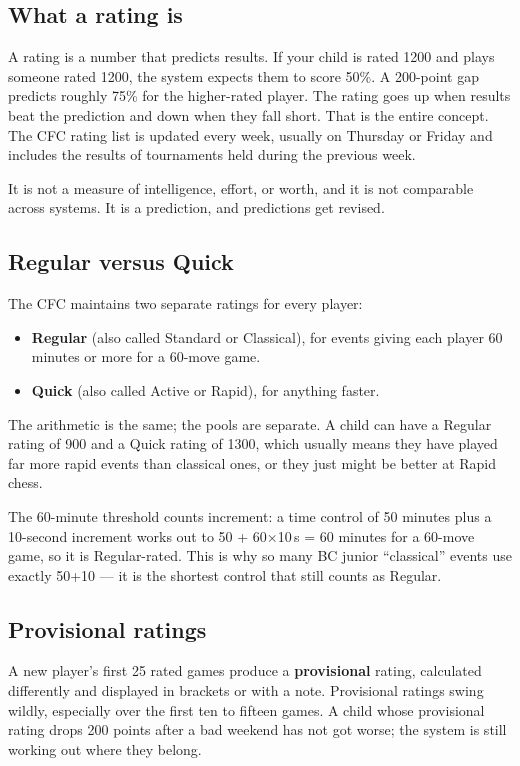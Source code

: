 \documentclass[10pt,letterpaper]{article}
\newcommand{\term}[1]{\textbf{#1}}
\begin{document}
\subsection{What a rating is}

A rating is a number that predicts results. If your child is rated 1200 and
plays someone rated 1200, the system expects them to score 50\%. A 200-point
gap predicts roughly 75\% for the higher-rated player. The rating goes up when
results beat the prediction and down when they fall short. That is the entire
concept. The CFC rating list is updated every week,
usually on Thursday or Friday and includes the results of tournaments held during the
previous week.

It is not a measure of intelligence, effort, or worth, and it is not
comparable across systems. It is a prediction, and predictions get revised.

\subsection{Regular versus Quick}

The CFC maintains two separate ratings for every player:

\begin{itemize}
  \item \term{Regular} (also called Standard or Classical), for events giving
        each player 60 minutes or more for a 60-move game.
  \item \term{Quick} (also called Active or Rapid), for anything faster.
\end{itemize}

The arithmetic is the same; the pools are separate. A child can have a Regular
rating of 900 and a Quick rating of 1300, which usually means they have played
far more rapid events than classical ones, or they just might be better at Rapid chess.

The 60-minute threshold counts increment: a time control of 50 minutes plus a
10-second increment works out to 50 + 60$\times$10\,s = 60 minutes for a 60-move
game, so it is Regular-rated. This is why so many BC junior ``classical'' events
use exactly 50+10 --- it is the shortest control that still counts as Regular.

\subsection{Provisional ratings}

A new player's first 25 rated games produce a \term{provisional} rating,
calculated differently and displayed in brackets or with a note. Provisional
ratings swing wildly, especially over the first ten to fifteen games. A child
whose provisional rating drops 200 points after a bad weekend has not got worse;
the system is still working out where they belong.
\end{document}
